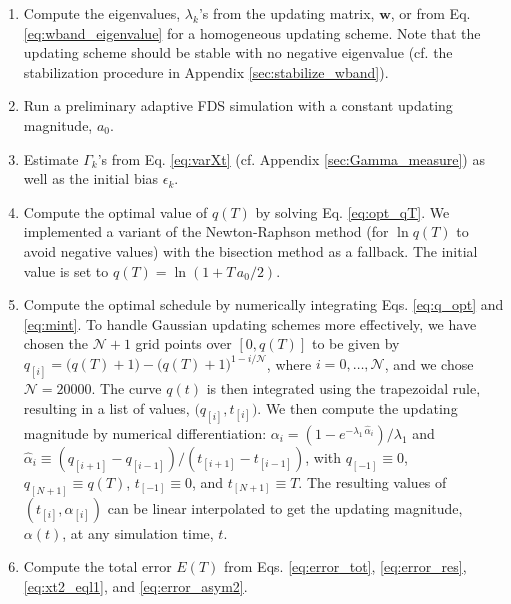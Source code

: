 \documentclass[reprint, superscriptaddress, floatfix]{revtex4-1}
\newcommand{\Err}{E}
\begin{document}
\begin{enumerate}

\item
Compute the eigenvalues, $\lambda_k$'s
from the updating matrix, $\mathbf w$,
or from Eq. \eqref{eq:wband_eigenvalue}
for a homogeneous updating scheme.
%
Note that
the updating scheme should be stable
with no negative eigenvalue
(cf. the stabilization procedure in Appendix \ref{sec:stabilize_wband}).

\item \label{step:prerun}
Run a preliminary adaptive FDS simulation
with a constant updating magnitude, $a_0$.

\item \label{step:gamma}
Estimate $\Gamma_k$'s from Eq. \eqref{eq:varXt}
    (cf. Appendix \ref{sec:Gamma_measure})
    as well as the initial bias $\epsilon_k$.

\item \label{step:qT}
Compute the optimal value of $q(T)$ by solving Eq. \eqref{eq:opt_qT}.
%
We implemented a variant of the Newton-Raphson method\cite{press3rd}
(for $\ln q(T)$ to avoid negative values)
with the bisection method\cite{press3rd} as a fallback.
The initial value is set to $q(T) = \ln(1+T\,a_0/2)$.
%

\item \label{step:alpha}
Compute the optimal schedule by
  numerically integrating Eqs. \eqref{eq:q_opt} and \eqref{eq:mint}.
%
To handle Gaussian updating schemes more effectively,
  we have chosen the $\mathcal N+1$ grid points over $[0, q(T)]$ to be given by
  $q_{[i]} = \bigl(q(T) + 1\bigr) - \bigl(q(T)+1\bigr)^{1-i/\mathcal N}$,
  where $i = 0, \dots, \mathcal N$, and we chose $\mathcal N=20000$.
%
The curve $q(t)$ is then integrated
  using the trapezoidal rule\cite{press3rd},
  resulting in a list of values, $\bigl(q_{[i]}, t_{[i]} \bigr)$.
%
We then compute the updating magnitude by numerical differentiation:
  $\alpha_i = (1 - e^{-\lambda_1 \, \hat \alpha_i})/\lambda_1$
  and
  $\hat \alpha_i \equiv (q_{[i+1]} - q_{[i-1]}) / (t_{[i+1]} - t_{[i-1]})$,
  with
  $q_{[ -1]} \equiv 0$,
  $q_{[N+1]} \equiv q(T)$,
  $t_{[ -1]} \equiv 0$, and
  $t_{[N+1]} \equiv T$.
%
The resulting values of $(t_{[i]}, \alpha_{[i]})$
  can be linear interpolated
  to get the updating magnitude, $\alpha(t)$, at any simulation time, $t$.


\item
  Compute the total error $\Err(T)$ from
Eqs. \eqref{eq:error_tot},
  \eqref{eq:error_res},
  \eqref{eq:xt2_eql1},
  and
  \eqref{eq:error_asym2}.

\end{enumerate}
\end{document}
